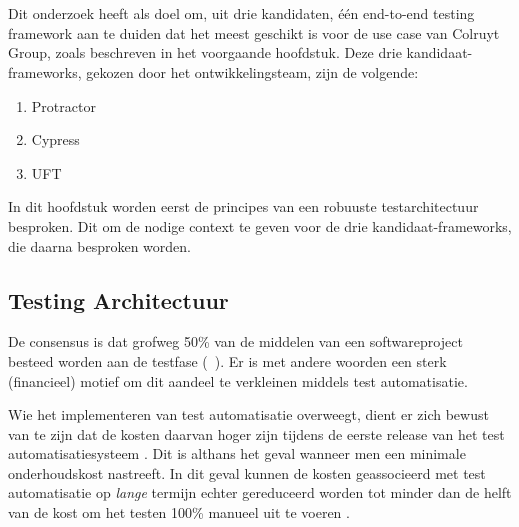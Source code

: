 \chapter{}
\label{ch:stand-van-zaken}



Dit onderzoek heeft als doel om, uit drie kandidaten, één end-to-end testing framework aan te duiden dat het meest geschikt is voor de use case van Colruyt Group, zoals beschreven in het voorgaande hoofdstuk. Deze drie kandidaat-frameworks, gekozen door het ontwikkelingsteam, zijn de volgende:

\begin{enumerate}
    \item Protractor
    \item Cypress
    \item UFT
\end{enumerate}

In dit hoofdstuk worden eerst de principes van een robuuste testarchitectuur besproken. Dit om de nodige context te geven voor de drie kandidaat-frameworks, die daarna besproken worden.

\section{Testing Architectuur}

De consensus is dat grofweg 50\% van de middelen van een softwareproject besteed worden aan de testfase (~\cite{Kasurinen2010,Tsai2001,Dadwal2018}). Er is met andere woorden een sterk (financieel) motief om dit aandeel te verkleinen middels test automatisatie.

Wie het implementeren van test automatisatie overweegt, dient er zich bewust van te zijn dat de kosten daarvan hoger zijn tijdens de eerste release van het test automatisatiesysteem \autocite{Fewster2001} \autocite{Kumar2016}. Dit is althans het geval wanneer men een minimale onderhoudskost nastreeft. In dit geval kunnen de kosten geassocieerd met test automatisatie op \emph{lange} termijn echter gereduceerd worden tot minder dan de helft van de kost om het testen 100\% manueel uit te voeren \autocite{Kumar2016}.

